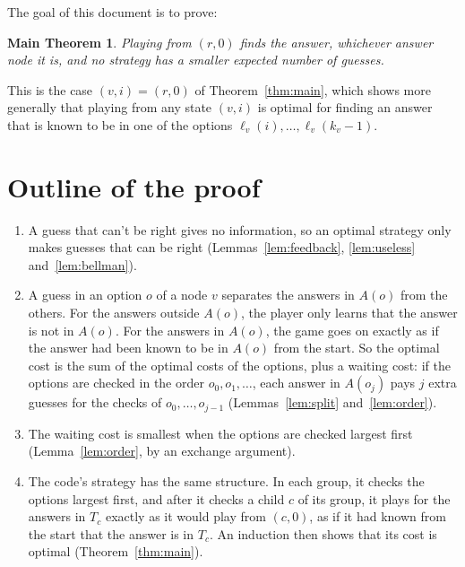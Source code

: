 \documentclass[11pt]{article}
\newtheorem*{maintheorem}{Main Theorem}
\begin{document}
The goal of this document is to prove:

\begin{maintheorem}
  Playing from $(r, 0)$ finds the answer, whichever answer node it is, and no
  strategy has a smaller expected number of guesses.
\end{maintheorem}

This is the case $(v, i) = (r, 0)$ of Theorem~\ref{thm:main}, which shows more
generally that playing from any state $(v, i)$ is optimal for finding an answer
that is known to be in one of the options $\ell_v(i), \dots, \ell_v(k_v - 1)$.

\section{Outline of the proof}

\begin{enumerate}
  \item A guess that can't be right gives no information, so an optimal strategy
    only makes guesses that can be right (Lemmas~\ref{lem:feedback},
    \ref{lem:useless} and~\ref{lem:bellman}).
  \item A guess in an option $o$ of a node $v$ separates the answers in $A(o)$
    from the others. For the answers outside $A(o)$, the player only learns that
    the answer is not in $A(o)$. For the answers in $A(o)$, the game goes on
    exactly as if the answer had been known to be in $A(o)$ from the start. So
    the optimal cost is the sum of the optimal costs of the options, plus a
    waiting cost: if the options are checked in the order $o_0, o_1, \dots$, each
    answer in $A(o_j)$ pays $j$ extra guesses for the checks of
    $o_0, \dots, o_{j-1}$ (Lemmas~\ref{lem:split} and~\ref{lem:order}).
  \item The waiting cost is smallest when the options are checked largest first
    (Lemma~\ref{lem:order}, by an exchange argument).
  \item The code's strategy has the same structure. In each group, it checks the
    options largest first, and after it checks a child $c$ of its group, it plays
    for the answers in $T_c$ exactly as it would play from $(c, 0)$, as if it had
    known from the start that the answer is in $T_c$. An induction then shows
    that its cost is optimal (Theorem~\ref{thm:main}).
\end{enumerate}

\end{document}
